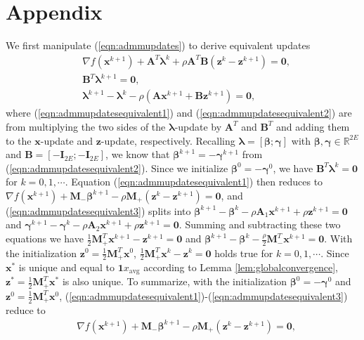 \documentclass[journal]{IEEEtran}
\begin{document}
\section*{Appendix}
\begin{IEEEproof} We first manipulate (\ref{eqn:admmupdates}) to derive equivalent updates 
\begin{align}
\label{eqn:admmupdatesequivalent1}
&\nabla f(\bm x^{k+1}) + \bm A^T\bm\lambda^k+\rho \bm A^T\bm B(\bm z^k-\bm z^{k+1})=\bm 0,\\
\label{eqn:admmupdatesequivalent2}
&\bm B^T\bm\lambda^{k+1} = \bm 0,\\
\label{eqn:admmupdatesequivalent3}
&\bm\lambda^{k+1}-\bm\lambda^k-\rho(\bm A \bm x^{k+1}+\bm B \bm z^{k+1})=\bm 0,
\end{align}
where (\ref{eqn:admmupdatesequivalent1}) and (\ref{eqn:admmupdatesequivalent2}) are from multiplying the two sides of the $\bm \lambda$-update by $\bm A^T$ and $\bm B^T$ and adding them to the $\bm x$-update and $\bm z$-update, respectively. Recalling $\bm \lambda=[\bm\beta;\bm\gamma]$ with $\bm\beta,\bm \gamma\in\mathbb{R}^{2E}$ and $\bm B = [-\bm I_{2E};-\bm I_{2E}]$, we know that $\bm\beta^{k+1}=-\bm\gamma^{k+1}$ from (\ref{eqn:admmupdatesequivalent2}). Since we initialize $\bm\beta^0=-\bm\gamma^0$, we have $\bm B^T\bm\lambda^k=\bm 0$ for $k = 0,1,\cdots$. Equation (\ref{eqn:admmupdatesequivalent1}) then reduces to $\nabla f(\bm x^{k+1})+\bm M_-\bm\beta^{k+1}-\rho\bm M_+(\bm z^k-\bm z^{k+1})=\bm 0$, and (\ref{eqn:admmupdatesequivalent3}) splits into $\bm\beta^{k+1}-\bm\beta^k-\rho \bm A_1 \bm x^{k+1}+\rho \bm z^{k+1}=\bm 0$ and $\bm\gamma^{k+1}-\bm\gamma^k-\rho\bm A_2\bm x^{k+1}+\rho\bm z^{k+1}=\bm 0$. Summing and subtracting these two equations we have $\frac{1}{2}\bm M_+^T\bm x^{k+1}-\bm z^{k+1}=\bm 0$ and $\bm\beta^{k+1}-\bm\beta^k-\frac{\rho}{2}\bm M_-^T\bm x^{k+1}=\bm 0$. With the initialization $\bm z^0=\frac{1}{2}\bm M_+^T\bm x^0$, $\frac{1}{2}\bm M_+^T\bm x^{k}-\bm z^{k}=\bm 0$ holds true for $k=0,1,\cdots$. Since $\bm x^*$ is unique and equal to $\bm 1x_\text{avg}$ according to Lemma \ref{lem:globalconvergence}, $\bm z^*=\frac{1}{2}\bm M_+^T\bm x^*$ is also unique. To summarize, with the initialization $\bm\beta^0=-\bm\gamma^0$ and $\bm z^0=\frac{1}{2}\bm M_+^T\bm x^0$, (\ref{eqn:admmupdatesequivalent1})-(\ref{eqn:admmupdatesequivalent3}) reduce to 
\begin{align}
\label{eqn:admmupdates21}
&\nabla f(\bm x^{k+1})+\bm M_-\bm\beta^{k+1}-\rho \bm M_+(\bm z^k-\bm z^{k+1})=\bm 0,\\

\end{align}
\end{IEEEproof}
\end{document}
